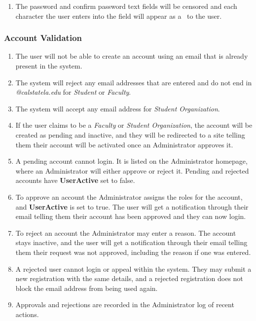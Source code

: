 \begin{enumerate}[leftmargin=3\parindent]
                \begin{itemize}
                    \item Organization name
                    \item Username
                    \item Password
                    \item Confirm password
                    \item Email Address
                    \item Description of the organization
                \end{itemize}
            \item The password and confirm password text fields will be censored and each character the user enters into the field will appear as a \textbullet\ to the user.
        \end{enumerate}
    \subsubsection{Account Validation}
        \begin{enumerate}[leftmargin=3\parindent]
            \item The user will not be able to create an account using an email that is already present in the system.
            \item The system will reject any email addresses that are entered and do not end in \emph{@calstatela.edu} for \emph{Student} or \emph{Faculty}.
            \item The system will accept any email address for \emph{Student Organization}.
            \item If the user claims to be a \emph{Faculty} or \emph{Student Organization}, the account will be created as pending and inactive, and they will be redirected to a site telling them their account will be activated once an Administrator approves it.
            \item A pending account cannot login. It is listed on the Administrator homepage, where an Administrator will either approve or reject it. Pending and rejected accounts have \textbf{UserActive} set to false.
            \item To approve an account the Administrator assigns the roles for the account, and \textbf{UserActive} is set to true. The user will get a notification through their email telling them their account has been approved and they can now login.
            \item To reject an account the Administrator may enter a reason. The account stays inactive, and the user will get a notification through their email telling them their request was not approved, including the reason if one was entered.
            \item A rejected user cannot login or appeal within the system. They may submit a new registration with the same details, and a rejected registration does not block the email address from being used again.
            \item Approvals and rejections are recorded in the Administrator log of recent actions.
        \end{enumerate}
